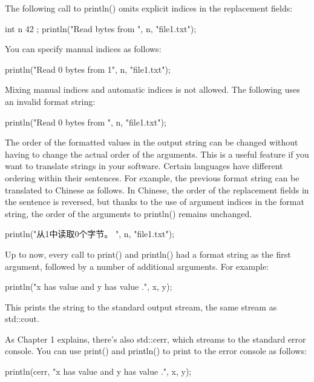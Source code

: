 The following call to println() omits explicit indices in the replacement fields:

\begin{cpp}
int n { 42 };
println("Read {} bytes from {}", n, "file1.txt");
\end{cpp}

You can specify manual indices as follows:

\begin{cpp}
println("Read {0} bytes from {1}", n, "file1.txt");
\end{cpp}

Mixing manual indices and automatic indices is not allowed. The following uses an invalid format string:

\begin{cpp}
println("Read {0} bytes from {}", n, "file1.txt");
\end{cpp}

The order of the formatted values in the output string can be changed without having to change the actual order of the arguments. This is a useful feature if you want to translate strings in your software. Certain languages have different ordering within their sentences. For example, the previous format string can be translated to Chinese as follows. In Chinese, the order of the replacement fields in the sentence is reversed, but thanks to the use of argument indices in the format string, the order of the arguments to println() remains unchanged.

\begin{cpp}
println("从{1}中读取{0}个字节。 ", n, "file1.txt");
\end{cpp}


Up to now, every call to print() and println() had a format string as the first argument, followed by a number of additional arguments. For example:

\begin{cpp}
println("x has value {} and y has value {}.", x, y);
\end{cpp}

This prints the string to the standard output stream, the same stream as std::cout.

As Chapter 1 explains, there’s also std::cerr, which streams to the standard error console. You can use print() and println() to print to the error console as follows:

\begin{cpp}
println(cerr, "x has value {} and y has value {}.", x, y);
\end{cpp}


